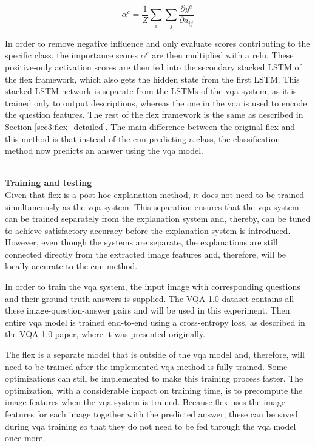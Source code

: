         \begin{equation}
            \alpha^c = \frac{1}{Z} \sum_i \sum_j \frac{\partial y^c}{\partial a_{ij}} 
        \label{eq:flex_activaiton_score}
        \end{equation}


        In order to remove negative influence and only evaluate scores contributing to the specific class, the importance scores $\alpha^c$ are then multiplied with a \gls{relu}. These positive-only activation scores are then fed into the secondary stacked LSTM of the \gls{flex} framework, which also gets the hidden state from the first LSTM. This stacked LSTM network is separate from the LSTMs of the \gls{vqa} system, as it is trained only to output descriptions, whereas the one in the \gls{vqa} is used to encode the question features. 
        The rest of the \gls{flex} framework is the same as described in Section \ref{sec3:flex_detailed}. The main difference between the original \gls{flex} and this method is that instead of the \gls{cnn} predicting a class, the classification method now predicts an answer using the \gls{vqa} model.
        
        
        
        \textbf{\\Training and testing\\}
        Given that \gls{flex} is a post-hoc explanation method, it does not need to be trained simultaneously as the \gls{vqa} system. This separation ensures that the \gls{vqa} system can be trained separately from the explanation system and, thereby, can be tuned to achieve satisfactory accuracy before the explanation system is introduced.
        However, even though the systems are separate, the explanations are still connected directly from the extracted image features and, therefore, will be locally accurate to the \gls{cnn} method.

        In order to train the \gls{vqa} system, the input image with corresponding questions and their ground truth answers is supplied. The VQA 1.0 dataset contains all these image-question-answer pairs and will be used in this experiment.
        Then entire \gls{vqa} model is trained end-to-end using a cross-entropy loss, as described in the VQA 1.0 paper, where it was presented originally.

        The \gls{flex} is a separate model that is outside of the \gls{vqa} model and, therefore, will need to be trained after the implemented \gls{vqa} method is fully trained. Some optimizations can still be implemented to make this training process faster. The optimization, with a considerable impact on training time, is to precompute the image features when the \gls{vqa} system is trained. Because \gls{flex} uses the image features for each image together with the predicted answer, these can be saved during \gls{vqa} training so that they do not need to be fed through the \gls{vqa} model once more.


